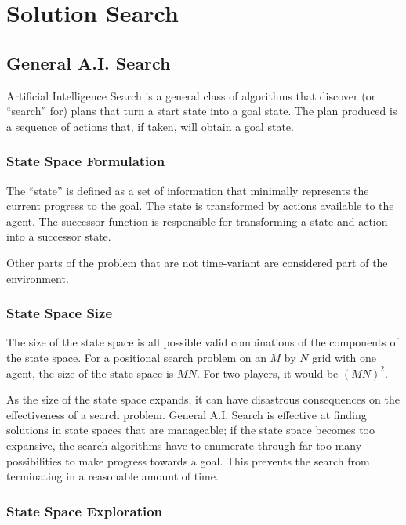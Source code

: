 								\chapter{Solution Search}

\section{General A.I. Search}

Artificial Intelligence Search is a general class of algorithms that discover (or ``search'' for) plans that turn a start state into a goal state. The plan produced is a sequence of actions that, if taken, will obtain a goal state.

	\subsection{State Space Formulation}

The ``state'' is defined as a set of information that minimally represents the current progress to the goal. The state is transformed by actions available to the agent. The successor function is responsible for transforming a state and action into a successor state.

Other parts of the problem that are not time-variant are considered part of the environment.

	\subsection{State Space Size}
The size of the state space is all possible valid combinations of the components of the state space. For a positional search problem on an $M$ by $N$ grid with one agent, the size of the state space is $MN$. For two players, it would be $(MN)^2$.

As the size of the state space expands, it can have disastrous consequences on the effectiveness of a search problem. General A.I. Search is effective at finding solutions in state spaces that are manageable; if the state space becomes too expansive, the search algorithms have to enumerate through far too many possibilities to make progress towards a goal. This prevents the search from terminating in a reasonable amount of time.

	\subsection{State Space Exploration}


